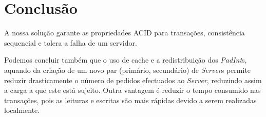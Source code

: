 \section{Conclusão}
A nossa solução garante as propriedades ACID para transações, consistência sequencial e tolera a falha de um servidor. 

Podemos concluir também que o uso de cache e a redistribuição dos \textit{PadInt}s, aquando da criação de um novo par (primário, secundário) de \textit{Server}s permite  reduzir drasticamente o número de pedidos efectuados ao \textit{Server}, reduzindo assim a carga a que este está sujeito. Outra vantagem é reduzir o tempo consumido nas transações, pois as leituras e escritas são mais rápidas devido a serem realizadas localmente.